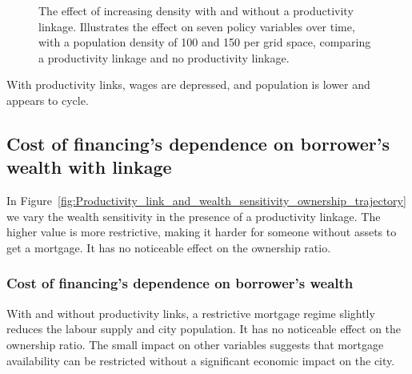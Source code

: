 \begin{figure}[h!tb]
    \caption[The effect of increasing density with and without a productivity linkage]{The effect of increasing density with and without a productivity linkage. Illustrates the effect on seven policy variables over time, with a population density of 100 and 150 per grid space, comparing a productivity linkage and no productivity linkage.}
    \label{fig:Productivity_link_W-WO-density}
\end{figure}

With productivity links, wages are depressed, and population is lower and appears to cycle.



\newpage
\subsection{Cost of financing's dependence on borrower's wealth with linkage}

In Figure~\ref{fig:Productivity_link_and_wealth_sensitivity_ownership_trajectory} we vary the wealth sensitivity in the presence of a productivity linkage. The higher value is more restrictive, making it harder for someone without assets to get a mortgage. It has no noticeable effect on the ownership ratio. %




\subsubsection{Cost of financing's dependence on borrower's wealth}

With and without productivity links, a restrictive mortgage regime slightly reduces the labour supply and city population. It has no noticeable effect on the ownership ratio. The small impact on other variables suggests that mortgage availability can be restricted %
without a significant economic impact on the city. 

